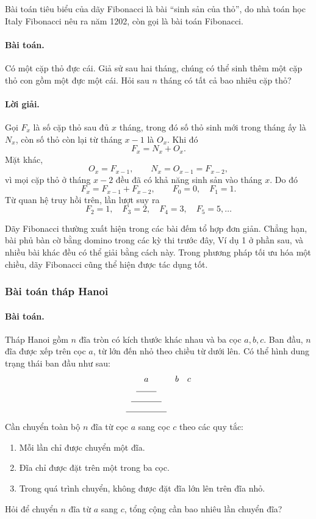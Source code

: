 \documentclass[11pt]{article}
\begin{document}
Bài toán tiêu biểu của dãy Fibonacci là bài ``sinh sản của thỏ'', do nhà toán
học Italy Fibonacci nêu ra năm 1202, còn gọi là bài toán Fibonacci.

\paragraph{Bài toán.}
Có một cặp thỏ đực cái. Giả sử sau hai tháng, chúng có thể sinh thêm một cặp
thỏ con gồm một đực một cái. Hỏi sau \(n\) tháng có tất cả bao nhiêu cặp thỏ?

\paragraph{Lời giải.}
Gọi \(F_x\) là số cặp thỏ sau đủ \(x\) tháng, trong đó số thỏ sinh mới trong
tháng ấy là \(N_x\), còn số thỏ còn lại từ tháng \(x-1\) là \(O_x\). Khi đó
\[
  F_x=N_x+O_x.
\]
Mặt khác,
\[
  O_x=F_{x-1},\qquad N_x=O_{x-1}=F_{x-2},
\]
vì mọi cặp thỏ ở tháng \(x-2\) đều đã có khả năng sinh sản vào tháng \(x\).
Do đó
\[
  F_x=F_{x-1}+F_{x-2},
  \qquad F_0=0,\quad F_1=1.
\]
Từ quan hệ truy hồi trên, lần lượt suy ra
\[
  F_2=1,\quad F_3=2,\quad F_4=3,\quad F_5=5,\ldots
\]

Dãy Fibonacci thường xuất hiện trong các bài đếm tổ hợp đơn giản. Chẳng hạn,
bài phủ bàn cờ bằng domino trong các kỳ thi trước đây, Ví dụ 1 ở phần sau,
và nhiều bài khác đều có thể giải bằng cách này. Trong phương pháp tối ưu hóa
một chiều, dãy Fibonacci cũng thể hiện được tác dụng tốt.

\subsubsection{Bài toán tháp Hanoi}

\paragraph{Bài toán.}
Tháp Hanoi gồm \(n\) đĩa tròn có kích thước khác nhau và ba cọc \(a,b,c\).
Ban đầu, \(n\) đĩa được xếp trên cọc \(a\), từ lớn đến nhỏ theo chiều từ dưới
lên. Có thể hình dung trạng thái ban đầu như sau:
\[
\begin{array}{ccc}
a & b & c\\
\rule{2.4em}{0.4pt} & &\\
\rule{3.6em}{0.4pt} & &\\
\rule{4.8em}{0.4pt} & &
\end{array}
\]
Cần chuyển toàn bộ \(n\) đĩa từ cọc \(a\) sang cọc \(c\) theo các quy tắc:
\begin{enumerate}
  \item Mỗi lần chỉ được chuyển một đĩa.
  \item Đĩa chỉ được đặt trên một trong ba cọc.
  \item Trong quá trình chuyển, không được đặt đĩa lớn lên trên đĩa nhỏ.
\end{enumerate}
Hỏi để chuyển \(n\) đĩa từ \(a\) sang \(c\), tổng cộng cần bao nhiêu lần
chuyển đĩa?
\end{document}

